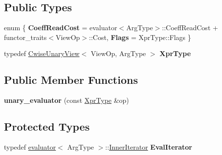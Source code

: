 \subsection*{Public Types}
\begin{DoxyCompactItemize}
\item 
\mbox{\label{struct_eigen_1_1internal_1_1unary__evaluator_3_01_cwise_unary_view_3_01_view_op_00_01_arg_type_01_4_00_01_iterator_based_01_4_ad6e5ff867920976b8ea586d5befc1673}} 
enum \{ {\bfseries Coeff\+Read\+Cost} = evaluator$<$Arg\+Type$>$\+::Coeff\+Read\+Cost + functor\+\_\+traits$<$View\+Op$>$\+::Cost, 
{\bfseries Flags} = Xpr\+Type\+::Flags
 \}
\item 
\mbox{\label{struct_eigen_1_1internal_1_1unary__evaluator_3_01_cwise_unary_view_3_01_view_op_00_01_arg_type_01_4_00_01_iterator_based_01_4_aab21b88b28cfc1f27ff30b5ba82b5958}} 
typedef \mbox{\hyperlink{class_eigen_1_1_cwise_unary_view}{Cwise\+Unary\+View}}$<$ View\+Op, Arg\+Type $>$ {\bfseries Xpr\+Type}
\end{DoxyCompactItemize}
\subsection*{Public Member Functions}
\begin{DoxyCompactItemize}
\item 
\mbox{\label{struct_eigen_1_1internal_1_1unary__evaluator_3_01_cwise_unary_view_3_01_view_op_00_01_arg_type_01_4_00_01_iterator_based_01_4_a44f6668184d496d893b256a274249620}} 
{\bfseries unary\+\_\+evaluator} (const \mbox{\hyperlink{class_eigen_1_1_cwise_unary_view}{Xpr\+Type}} \&op)
\end{DoxyCompactItemize}
\subsection*{Protected Types}
\begin{DoxyCompactItemize}
\item 
\mbox{\label{struct_eigen_1_1internal_1_1unary__evaluator_3_01_cwise_unary_view_3_01_view_op_00_01_arg_type_01_4_00_01_iterator_based_01_4_af5716e831f05ed2e87745522e85b9bdd}} 
typedef \mbox{\hyperlink{struct_eigen_1_1internal_1_1evaluator}{evaluator}}$<$ Arg\+Type $>$\+::\mbox{\hyperlink{class_eigen_1_1_inner_iterator}{Inner\+Iterator}} {\bfseries Eval\+Iterator}
\end{DoxyCompactItemize}
